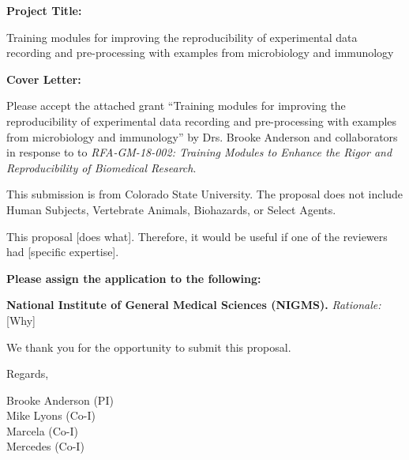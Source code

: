 \documentclass[pdftex,english,11pt,parskip=half]{scrartcl}
\begin{document}
\def\bf{\normalfont\bfseries}
\pagestyle{empty}


{\large \textbf{Project Title:}}

Training modules for improving the reproducibility of experimental data recording and pre-processing with examples from microbiology and immunology

\clearpage


{\large \textbf{Cover Letter:}}

Please accept the attached grant ``Training modules for improving the reproducibility of experimental data recording and pre-processing with examples from microbiology and immunology'' by Drs. Brooke Anderson and collaborators in response to to \textit{RFA-GM-18-002: Training Modules to Enhance the Rigor and Reproducibility of Biomedical Research}.

\vspace{0.1in}

This submission is from Colorado State University. The proposal does not include Human Subjects, Vertebrate Animals, Biohazards, or Select Agents.

\vspace{0.1in}

This proposal [does what]. Therefore, it would be useful if one of the reviewers had [specific expertise]. 

\vspace{0.1in}

\noindent \textbf{Please assign the application to the following:}
\begin{description}
 \item \textbf{National Institute of General Medical Sciences (NIGMS).} 
   \textit{Rationale:} [Why]  
 \end{description}

\vspace{0.1in}

We thank you for the opportunity to submit this proposal. 

\vspace{0.2in}

Regards, 

\vspace{0.8in}

Brooke Anderson (PI) \\
Mike Lyons (Co-I) \\
Marcela (Co-I) \\
Mercedes (Co-I) 
\end{document}

